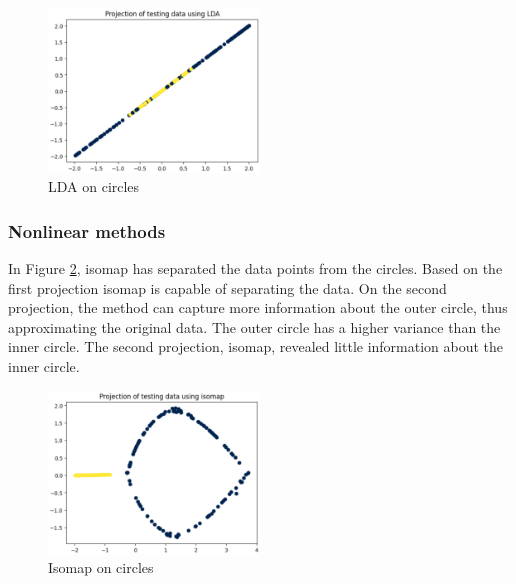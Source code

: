 \begin{figure}[htb!]
    \centering
    \includegraphics[width=0.5\textwidth]{figures/theory-example-figures/circles-lda.png}
    \caption{LDA on circles}
    \label{fig:circles-lda}
    \end{figure}
    
\subsubsection{Nonlinear methods}\label{subsubsec:nonlinear-methods-on-circles}
In Figure \ref{fig:circles-isomap}, \gls{isomap} has separated the data points from the circles. Based on the first projection \gls{isomap} is capable of separating the data. On the second projection, the method can capture more information about the outer circle, thus approximating the original data. The outer circle has a higher variance than the inner circle. The second projection, \gls{isomap}, revealed little information about the inner circle.
\begin{figure}[htb!]
    \centering
    \includegraphics[width=0.5\textwidth]{figures/theory-example-figures/circles-isomap.png}
    \caption{Isomap on circles}
    \label{fig:circles-isomap}
\end{figure}


